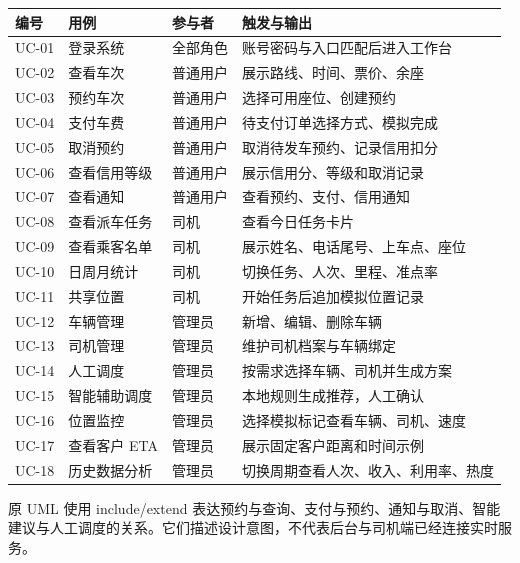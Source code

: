 \documentclass[UTF8,fontset=fandol,zihao=-4,oneside]{ctexrep}
\begin{document}
\begin{longtable}{p{1.4cm}p{4cm}p{2.2cm}p{6.8cm}}
\toprule 编号 & 用例 & 参与者 & 触发与输出 \\ \midrule
UC-01 & 登录系统 & 全部角色 & 账号密码与入口匹配后进入工作台 \\
UC-02 & 查看车次 & 普通用户 & 展示路线、时间、票价、余座 \\
UC-03 & 预约车次 & 普通用户 & 选择可用座位、创建预约 \\
UC-04 & 支付车费 & 普通用户 & 待支付订单选择方式、模拟完成 \\
UC-05 & 取消预约 & 普通用户 & 取消待发车预约、记录信用扣分 \\
UC-06 & 查看信用等级 & 普通用户 & 展示信用分、等级和取消记录 \\
UC-07 & 查看通知 & 普通用户 & 查看预约、支付、信用通知 \\
UC-08 & 查看派车任务 & 司机 & 查看今日任务卡片 \\
UC-09 & 查看乘客名单 & 司机 & 展示姓名、电话尾号、上车点、座位 \\
UC-10 & 日周月统计 & 司机 & 切换任务、人次、里程、准点率 \\
UC-11 & 共享位置 & 司机 & 开始任务后追加模拟位置记录 \\
UC-12 & 车辆管理 & 管理员 & 新增、编辑、删除车辆 \\
UC-13 & 司机管理 & 管理员 & 维护司机档案与车辆绑定 \\
UC-14 & 人工调度 & 管理员 & 按需求选择车辆、司机并生成方案 \\
UC-15 & 智能辅助调度 & 管理员 & 本地规则生成推荐，人工确认 \\
UC-16 & 位置监控 & 管理员 & 选择模拟标记查看车辆、司机、速度 \\
UC-17 & 查看客户 ETA & 管理员 & 展示固定客户距离和时间示例 \\
UC-18 & 历史数据分析 & 管理员 & 切换周期查看人次、收入、利用率、热度 \\
\bottomrule
\end{longtable}
原 UML 使用 include/extend 表达预约与查询、支付与预约、通知与取消、智能建议与人工调度的关系。它们描述设计意图，不代表后台与司机端已经连接实时服务。
\end{document}
